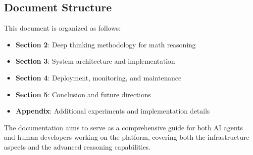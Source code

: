 \subsection{Document Structure}

This document is organized as follows:
\begin{itemize}
    \item \textbf{Section 2}: Deep thinking methodology for math reasoning
    \item \textbf{Section 3}: System architecture and implementation
    \item \textbf{Section 4}: Deployment, monitoring, and maintenance
    \item \textbf{Section 5}: Conclusion and future directions
    \item \textbf{Appendix}: Additional experiments and implementation details
\end{itemize}

The documentation aims to serve as a comprehensive guide for both AI agents and human developers working on the \sysname{} platform, covering both the infrastructure aspects and the advanced reasoning capabilities.
